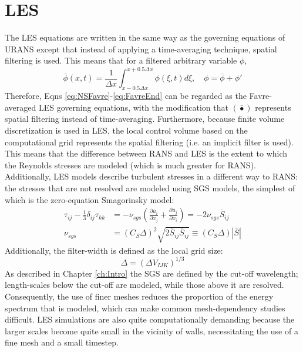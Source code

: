 \section{LES}
The LES equations are written in the same way as the governing equations of URANS except that instead of applying a time-averaging technique, spatial filtering is used. This means that for a filtered arbitrary variable $\phi$,
\begin{equation}
  \overline{\phi}(x,t) = \frac{1}{\Delta x}\int ^{x+0.5\Delta x} _{x-0.5\Delta x} \phi(\xi,t) d\xi, \quad \phi = \overline{\phi}+\phi'
\end{equation}
Therefore, Eqns \ref{eq:NSFavre}-\ref{eq:FavreEnd} can be regarded as the Favre-averaged LES governing equations, with the modification that $\left(\bar{\bullet}\right)$ represents spatial filtering instead of time-averaging. Furthermore, because finite volume discretization is used in LES, the local control volume based on the computational grid represents the spatial filtering (i.e. an implicit filter is used). This means that the difference between RANS and LES is the extent to which the Reynolds stresses are modeled (which is much greater for RANS). Additionally, LES models describe turbulent stresses in a different way to RANS: the stresses that are not resolved are modeled using SGS models, the simplest of which is the zero-equation Smagorinsky model\cite{Smagorinsky}:
\begin{equation}
  \begin{aligned}  \tau_{ij} - \frac{1}{3}\delta_{ij}\tau_{kk} &= -\nu_{sgs}\left(\frac{\partial \overline{u}_i}{\partial x_j}+\frac{\partial \overline{u}_j}{\partial x_i}\right) = -2\nu_{sgs}\overline{S}_{ij}\\
  \nu_{sgs} &=\left(C_S\Delta \right)^2\sqrt{2\overline{S}_{ij}\overline{S}_{ij}} \equiv \left(C_S\Delta \right)\left|\overline{S}\right|
  \end{aligned}
\end{equation}
Additionally, the filter-width is defined as the local grid size:
\begin{equation}
  \Delta = \left(\Delta V_{IJK}\right)^{1/3}
\end{equation}
As described in Chapter \ref{ch:Intro} the SGS are defined by the cut-off wavelength; length-scales below the cut-off are modeled, while those above it are resolved. Consequently, the use of finer meshes reduces the proportion of the energy spectrum that is modeled, which can make common mesh-dependency studies difficult. LES simulations are also quite computationally demanding because the larger scales become quite small in the vicinity of walls, necessitating the use of a fine mesh and a small timestep.

